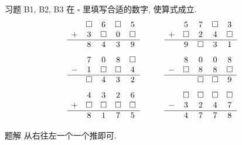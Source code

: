 \documentclass[content.tex]{subfiles}
\begin{document}
\begin{frame}{习题 B1, B2, B3}
在 $\square$ 里填写合适的数字, 使算式成立.
$$
\begin{matrix}
  & \square &       6 & \square &       5 \\
+ &       3 & \square &       0 & \square \\
\hline
  &       8 &       4 &       3 &       9 \\
\end{matrix}
\qquad\qquad
\begin{matrix}
  &       5 &       7 & \square &       3 \\
+ & \square &       2 &       4 & \square \\
\hline
  &       9 & \square &       3 &       1 \\
\end{matrix}
$$
$$
\begin{matrix}
  &       7 &       0 &       8 & \square \\
- &       1 & \square & \square &       4 \\
\hline
  & \square &       4 &       3 &       2 \\
\end{matrix}
\qquad\qquad
\begin{matrix}
  &       8 &       0 &       0 &       8 \\
- & \square &       8 &       8 & \square \\
\hline
  &         & \square & \square &       9 \\
\end{matrix}
$$
$$
\begin{matrix}
  &       4 &       3 &       2 &       6 \\
+ & \square & \square & \square & \square \\
\hline
  &       8 &       1 &       7 &       5 \\
\end{matrix}
\qquad\qquad
\begin{matrix}
  & \square & \square & \square & \square \\
- &       3 &       2 &       4 &       7 \\
\hline
  &       4 &       7 &       7 &       8 \\
\end{matrix}
$$
\begin{exampleblock}{题解}
从右往左一个一个推即可.
\end{exampleblock}
\end{frame}
\end{document}
